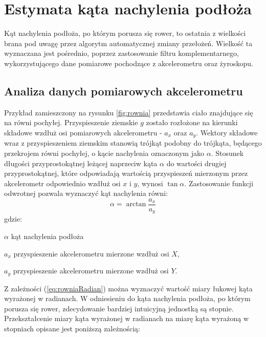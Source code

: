 \section{Estymata kąta nachylenia podłoża}
Kąt nachylenia podłoża, po którym porusza się rower, to ostatnia z wielkości  brana pod uwagę przez algorytm automatycznej zmiany przełożeń. Wielkość ta wyznaczana jest pośrednio, poprzez zastosowanie filtru komplementarnego, wykorzystującego dane pomiarowe pochodzące z akcelerometru oraz żyroskopu.

\subsection{Analiza danych pomiarowych akcelerometru}
\label{pomiaryAkcel}
Przykład zamieszczony na rysunku \ref{fig:rownia} przedstawia ciało znajdujące się na równi pochyłej. Przyspieszenie ziemskie \textit{$g$} zostało rozłożone na kierunki składowe wzdłuż osi pomiarowych akcelerometru - \textit{$a_x$} oraz \textit{$a_y$}. Wektory składowe wraz z przyspieszeniem ziemskim stanowią trójkąt podobny do trójkąta, będącego przekrojem równi pochyłej, o kącie nachylenia oznaczonym jako $\alpha$. Stosunek długości przyprostokątnej leżącej naprzeciw kąta $\alpha$ do wartości drugiej przyprostokątnej, które odpowiadają wartością przyspieszeń mierzonym przez akcelerometr odpowiednio wzdłuż osi $x$ i $y$, wynosi $\tan{\alpha}$. Zastosowanie funkcji odwrotnej pozwala wyznaczyć kąt nachylenia równi:
\begin{equation}
    \alpha=\arctan{\frac{a_x}{a_y}}
    \label{eq:rowniaRadian}
\end{equation}
gdzie:
\begin{eqwhere}[2cm]
	\item[$\alpha$] kąt nachylenia podłoża
	\item[$a_x$] przyspieszenie akcelerometru mierzone wzdłuż osi $X$,
	\item[$a_y$] przyspieszenie akcelerometru mierzone wzdłuż osi $Y$.
\end{eqwhere}
Z zależności (\ref{eq:rowniaRadian}) można wyznaczyć wartość miary łukowej kąta wyrażonej w radianach. W odniesieniu do kąta nachylenia podłoża, po którym porusza się rower, zdecydowanie bardziej intuicyjną jednostką są stopnie. Przekształcenie miary kąta wyrażonej w radianach na miarę kąta wyrażoną w stopniach opisane jest poniższą zależnością:
